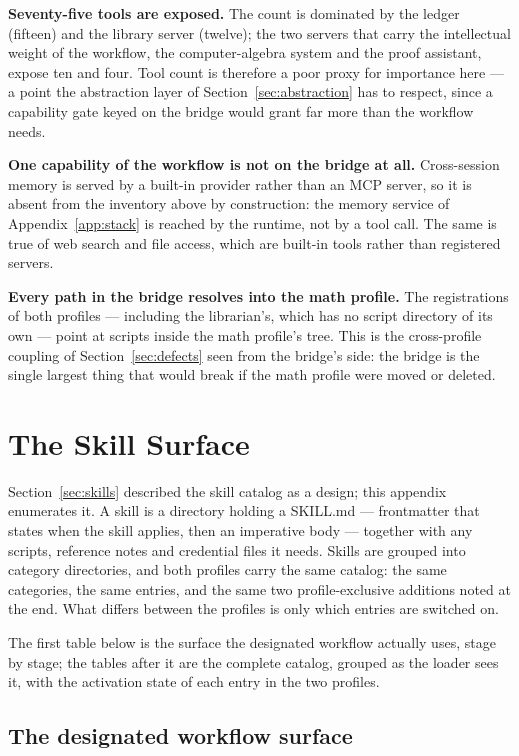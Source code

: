 \documentclass[10pt]{article}
\newcommand{\mono}[1]{{\ttfamily\small #1}}
\begin{document}
\textbf{Seventy-five tools are exposed.} The count is dominated by the ledger (fifteen) and the
library server (twelve); the two servers that carry the intellectual weight of the workflow, the
computer-algebra system and the proof assistant, expose ten and four. Tool count is therefore a poor
proxy for importance here --- a point the abstraction layer of Section~\ref{sec:abstraction} has to
respect, since a capability gate keyed on the bridge would grant far more than the workflow needs.

\textbf{One capability of the workflow is not on the bridge at all.} Cross-session memory is served
by a built-in provider rather than an MCP server, so it is absent from the inventory above by
construction: the memory service of Appendix~\ref{app:stack} is reached by the runtime, not by a
tool call. The same is true of web search and file access, which are built-in tools rather than
registered servers.

\textbf{Every path in the bridge resolves into the math profile.} The registrations of both profiles
--- including the librarian's, which has no script directory of its own --- point at scripts inside
the math profile's tree. This is the cross-profile coupling of Section~\ref{sec:defects} seen from the
bridge's side: the bridge is the single largest thing that would break if the math profile were moved
or deleted.

\section{The Skill Surface}\label{app:skills}

Section~\ref{sec:skills} described the skill catalog as a design; this appendix enumerates it.
A skill is a directory holding a \mono{SKILL.md} --- frontmatter that states when the skill applies,
then an imperative body --- together with any scripts, reference notes and credential files it needs.
Skills are grouped into category directories, and both profiles carry the same catalog: the same
categories, the same entries, and the same two profile-exclusive additions noted at the end. What
differs between the profiles is only which entries are switched on.

The first table below is the surface the designated workflow actually uses, stage by stage; the
tables after it are the complete catalog, grouped as the loader sees it, with the activation state of
each entry in the two profiles.

\subsection{The designated workflow surface}
\end{document}
